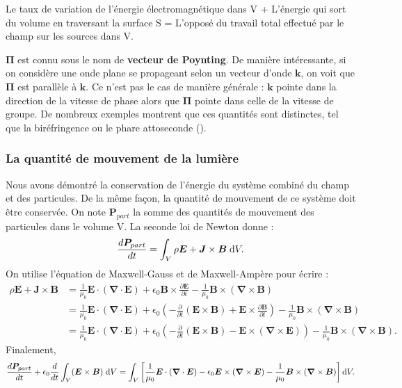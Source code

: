Le taux de variation de l'énergie électromagnétique dans V + L'énergie qui sort du volume en traversant la surface S = L'opposé du travail total effectué par le champ sur les sources dans V.

$\bm{\Pi}$ est connu sous le nom de \textbf{vecteur de Poynting}. De manière intéressante, si on considère une onde plane se propageant selon un vecteur d'onde $\bm{k}$, on voit que $\bm{\Pi}$ est parallèle à $\bm{k}$. Ce n'est pas le cas de manière générale : $\bm{k}$ pointe dans la direction de la vitesse de phase alors que $\bm{\Pi}$ pointe dans celle de la vitesse de groupe. De nombreux exemples montrent que ces quantités sont distinctes, tel que la biréfringence ou le phare attoseconde (). 

\subsubsection{La quantité de mouvement de la lumière}
Nous avons démontré la conservation de l'énergie du système combiné du champ et des particules. De la même façon, la quantité de mouvement de ce système doit être conservée. On note $\bm{P}_{part}$ la somme des quantités de mouvement des particules dans le volume V. La seconde loi de Newton donne :
\begin{equation*}
\frac{d\bm{P}_{part}}{dt}=\int_V \rho \bm{E} + \bm{J}\times\bm{B}\;\mathrm{d} V.
\end{equation*} 
On utilise l'équation de Maxwell-Gauss et de Maxwell-Ampère pour écrire :
\begin{align*}
\rho \bm{E} + \bm{J}\times\bm{B} &= \frac{1}{\mu_0} \bm{E}\cdot(\bm{\nabla}\cdot\bm{E})+\epsilon_0 \bm{B}\times\frac{\partial \bm{E}}{\partial t}-\frac{1}{\mu_0}\bm{B}\times(\bm{\nabla}\times\bm{B})\\
&= \frac{1}{\mu_0} \bm{E}\cdot(\bm{\nabla}\cdot\bm{E})+\epsilon_0 
\left(-\frac{\partial}{\partial t}(\bm{E}\times\bm{B})+\bm{E}\times\frac{\partial \bm{B}}{\partial t}\right)
-\frac{1}{\mu_0}\bm{B}\times(\bm{\nabla}\times\bm{B})\\
&= \frac{1}{\mu_0} \bm{E}\cdot(\bm{\nabla}\cdot\bm{E})+\epsilon_0\left(-\frac{\partial}{\partial t}(\bm{E}\times\bm{B})-\bm{E}\times(\bm{\nabla}\times\bm{E})\right)
-\frac{1}{\mu_0}\bm{B}\times(\bm{\nabla}\times\bm{B}).
\end{align*} 
Finalement,
\begin{equation*}
\frac{d\bm{P}_{part}}{dt}+\epsilon_0\frac{d}{dt}\int_V (\bm{E}\times\bm{B})\; \mathrm{d} V=\int_V \left[\frac{1}{\mu_0} \bm{E}\cdot(\bm{\nabla}\cdot\bm{E})-\epsilon_0\bm{E}\times(\bm{\nabla}\times\bm{E})
-\frac{1}{\mu_0}\bm{B}\times(\bm{\nabla}\times\bm{B})\right]\mathrm{d} V.
\end{equation*} 

